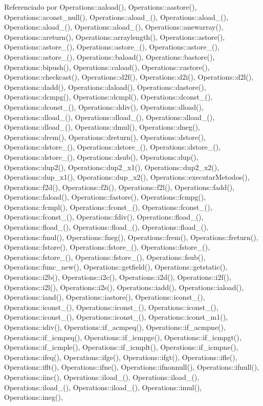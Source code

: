 Referenciado por Operations\+::aaload(), Operations\+::aastore(), Operations\+::aconst\+\_\+null(), Operations\+::aload\+\_(), Operations\+::aload\+\_(), Operations\+::aload\+\_(), Operations\+::aload\+\_(), Operations\+::anewarray(), Operations\+::areturn(), Operations\+::arraylength(), Operations\+::astore(), Operations\+::astore\+\_(), Operations\+::astore\+\_(), Operations\+::astore\+\_(), Operations\+::astore\+\_(), Operations\+::baload(), Operations\+::bastore(), Operations\+::bipush(), Operations\+::caload(), Operations\+::castore(), Operations\+::checkcast(), Operations\+::d2f(), Operations\+::d2i(), Operations\+::d2l(), Operations\+::dadd(), Operations\+::daload(), Operations\+::dastore(), Operations\+::dcmpg(), Operations\+::dcmpl(), Operations\+::dconst\+\_(), Operations\+::dconst\+\_(), Operations\+::ddiv(), Operations\+::dload(), Operations\+::dload\+\_(), Operations\+::dload\+\_(), Operations\+::dload\+\_(), Operations\+::dload\+\_(), Operations\+::dmul(), Operations\+::dneg(), Operations\+::drem(), Operations\+::dreturn(), Operations\+::dstore(), Operations\+::dstore\+\_(), Operations\+::dstore\+\_(), Operations\+::dstore\+\_(), Operations\+::dstore\+\_(), Operations\+::dsub(), Operations\+::dup(), Operations\+::dup2(), Operations\+::dup2\+\_\+x1(), Operations\+::dup2\+\_\+x2(), Operations\+::dup\+\_\+x1(), Operations\+::dup\+\_\+x2(), Operations\+::executar\+Metodos(), Operations\+::f2d(), Operations\+::f2i(), Operations\+::f2l(), Operations\+::fadd(), Operations\+::faload(), Operations\+::fastore(), Operations\+::fcmpg(), Operations\+::fcmpl(), Operations\+::fconst\+\_(), Operations\+::fconst\+\_(), Operations\+::fconst\+\_(), Operations\+::fdiv(), Operations\+::fload\+\_(), Operations\+::fload\+\_(), Operations\+::fload\+\_(), Operations\+::fload\+\_(), Operations\+::fmul(), Operations\+::fneg(), Operations\+::frem(), Operations\+::freturn(), Operations\+::fstore(), Operations\+::fstore\+\_(), Operations\+::fstore\+\_(), Operations\+::fstore\+\_(), Operations\+::fstore\+\_(), Operations\+::fsub(), Operations\+::func\+\_\+new(), Operations\+::getfield(), Operations\+::getstatic(), Operations\+::i2b(), Operations\+::i2c(), Operations\+::i2d(), Operations\+::i2f(), Operations\+::i2l(), Operations\+::i2s(), Operations\+::iadd(), Operations\+::iaload(), Operations\+::iand(), Operations\+::iastore(), Operations\+::iconst\+\_(), Operations\+::iconst\+\_(), Operations\+::iconst\+\_(), Operations\+::iconst\+\_(), Operations\+::iconst\+\_(), Operations\+::iconst\+\_(), Operations\+::iconst\+\_\+m1(), Operations\+::idiv(), Operations\+::if\+\_\+acmpeq(), Operations\+::if\+\_\+acmpne(), Operations\+::if\+\_\+icmpeq(), Operations\+::if\+\_\+icmpge(), Operations\+::if\+\_\+icmpgt(), Operations\+::if\+\_\+icmple(), Operations\+::if\+\_\+icmplt(), Operations\+::if\+\_\+icmpne(), Operations\+::ifeq(), Operations\+::ifge(), Operations\+::ifgt(), Operations\+::ifle(), Operations\+::iflt(), Operations\+::ifne(), Operations\+::ifnonnull(), Operations\+::ifnull(), Operations\+::iinc(), Operations\+::iload\+\_(), Operations\+::iload\+\_(), Operations\+::iload\+\_(), Operations\+::iload\+\_(), Operations\+::imul(), Operations\+::ineg(), 